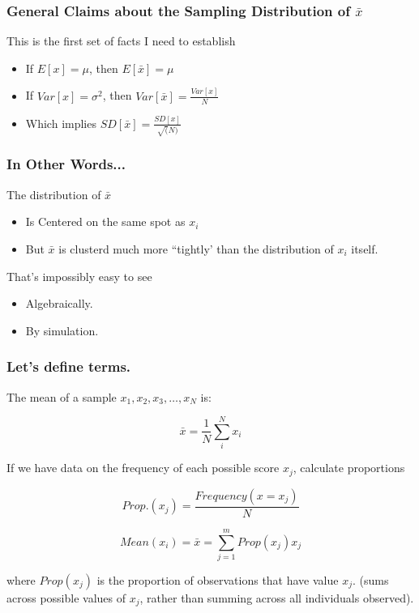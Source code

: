 \documentclass[10pt,english]{beamer}
\begin{document}
\begin{frame}
  \frametitle{General Claims about the Sampling Distribution of $\bar{x}$}
  This is the first set of facts I need to establish
  \begin{itemize}
  \item If $E[x] = \mu$, then $E[\bar{x}]=\mu$
  \item If $Var[x] = \sigma^{2}$, then $Var[\bar{x}]=\frac{Var[x]}{N}$
  \item Which implies $SD[\bar{x}]=\frac{SD[x]}{\sqrt(N)}$ 
  \end{itemize}   
\end{frame}

\begin{frame}
  \frametitle{In Other Words...}
  
  The distribution of $\bar{x}$ 
  \begin{itemize}
  \item Is Centered on the same spot as $x_{i}$
  \item But $\bar{x}$ is clusterd much  more ``tightly'
    than the distribution of $x_i$ itself.
  \end{itemize}
  
  That's impossibly easy to see
  
  \begin{itemize}
  \item Algebraically. 
  \item By simulation.
  \end{itemize}
\end{frame}


\begin{frame}
\frametitle{Let's define terms.}

The mean of a sample ${x_1, x_2, x_3, \ldots,x_N}$ is:

\begin{equation}
\bar{x}=\frac{1}{N} \sum_{i}^{N} x_{i}\label{eq:-2}
\end{equation}

If we have data on the frequency of each possible score $x_{j}$, calculate proportions

\begin{equation}
  Prop.(x_{j})=\frac{Frequency(x=x_{j})}{N} 
 \end{equation}

\begin{equation}
Mean(x_{i})=\bar{x} = \sum_{j=1}^{m} Prop(x_{j})x_{j}\label{eq:-3}\end{equation}

where $Prop(x_{j})$ is the proportion of observations that
have value $x_{j}$. (sums across possible values of $x_j$, rather than
summing across all individuals observed). 

\end{frame}
\end{document}
